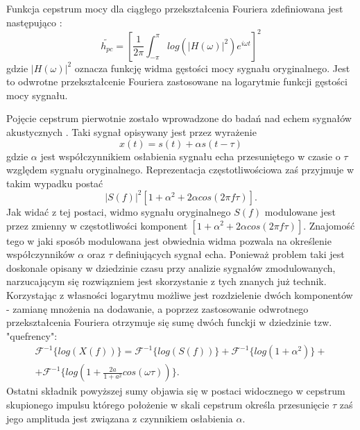 Funkcja cepstrum mocy dla ciągłego przekształcenia Fouriera zdefiniowana jest następująco \cite{fosr}:
\begin{equation}
    \tilde{h_{pc}} = \left[\frac{1}{2\pi}\int_{-\pi}^{\pi}log\left(| H(\omega)  |^2\right)e^{i \omega t}\right]^2
\end{equation}
gdzie $ |H(\omega)|^2 $ oznacza funkcję widma gęstości mocy sygnału oryginalnego. Jest to odwrotne przekształcenie Fouriera zastosowane na logarytmie funkcji gęstości mocy sygnału.

Pojęcie cepstrum pierwotnie zostało wprowadzone do badań nad echem sygnałów akustycznych \cite{hdsp}. Taki sygnał opisywany jest przez wyrażenie 
\begin{equation}
     x(t) = s(t) + \alpha s(t - \tau) 
\end{equation} 
gdzie $ \alpha $ jest współczynnikiem osłabienia sygnału echa przesuniętego w czasie o $ \tau $ względem sygnału oryginalnego. Reprezentacja częstotliwościowa zaś przyjmuje w takim wypadku postać 
\begin{equation}
    |S(f)|^2\left[ 1+ \alpha^2+2\alpha cos(2\pi f\tau)\right].
\end{equation}
Jak widać z tej postaci, widmo sygnału oryginalnego $S(f)$ modulowane jest przez zmienny w częstotliwości komponent $[1 + \alpha^2 + 2\alpha cos(2\pi f \tau)]$. Znajomość tego w jaki sposób modulowana jest obwiednia widma pozwala na określenie współczynników $\alpha$  oraz $\tau$ definiujących sygnał echa. Ponieważ problem taki jest doskonale opisany w dziedzinie czasu przy analizie sygnałów zmodulowanych, narzucającym się rozwiązniem jest skorzystanie z tych znanych już technik. Korzystając z własności logarytmu możliwe jest rozdzielenie dwóch komponentów - zamianę mnożenia na dodawanie, a poprzez zastosowanie odwrotnego przekształcenia Fouriera otrzymuje się sumę dwóch funckji w dziedzinie tzw. "quefrency": 
\begin{equation}
    \begin{split}
    \mathcal{F}^{-1}\{log(X(f))\} =   \mathcal{F}^{-1}\{log(S(f))\} + \mathcal{F}^{-1}\{log(1+\alpha^2)\} + \\ + \mathcal{F}^{-1}\{log(1+\frac{2a}{1+a^2} cos(\omega \tau))\}.
    \end{split}
\end{equation}
Ostatni składnik powyższej sumy objawia się w postaci widocznego w cepstrum skupionego impulsu którego położenie w skali cepstrum określa przesunięcie $\tau$ zaś jego amplituda jest związana z czynnikiem osłabienia $\alpha$. 

